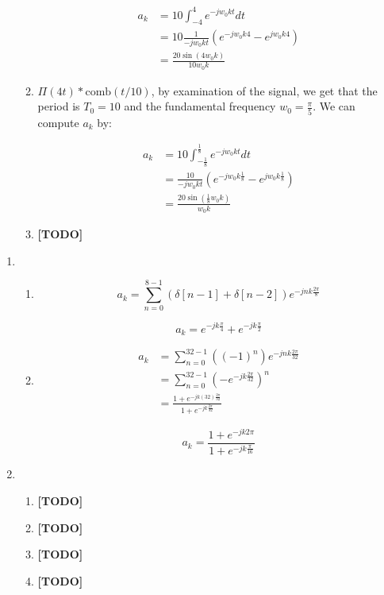 \documentclass[]{article}
\begin{document}
\begin{enumerate}
\begin{enumerate}
    \begin{align*}
        a_k &= 10\int_{-4}^{4} e^{-jw_0 k t} dt \\
            &= 10 \frac{1}{-jw_0kt} \left(  e^{-jw_0k4}- e^{jw_0k4}\right) \\
            &= \boxed{ \frac{20\sin(4w_0 k)}{10 w_0 k} }
    \end{align*}
  \item
    \(\Pi(4t) * \text{comb}(t / 10)\), by examination of the signal, we
    get that the period is \(T_0 = 10\) and the fundamental frequency
    \(\boxed{w_0 = \frac{\pi}{5}}\). We can compute \(a_k\) by:

    \begin{align*}
        a_k &= 10 \int_{-\frac{1}{8}}^{\frac{1}{8}} e^{-jw_0 k t} dt \\
            &= \frac{10}{-jw_0kt } \left(
                e^{-jw_0k\frac{1}{8}}- e^{jw_0k\frac{1}{8}}
            \right) \\
        &= \boxed{ \frac{20\sin(\frac{1}{8}w_0 k)}{w_0 k} }
    \end{align*}
  \item
    \textbf{{[}TODO{]}}
  \end{enumerate}
\end{enumerate}

\begin{enumerate}
\def\labelenumi{\arabic{enumi}.}
\setcounter{enumi}{4}
\item
  \begin{enumerate}
  \def\labelenumii{\alph{enumii}.}
  \item
    \[
        a_k = \sum_{n = 0}^{8 - 1} (\delta[n - 1] + \delta[n - 2]) e^{-j n k \frac{2\pi}{8}}
    \]

    \[
        \boxed{a_k = e^{-jk\frac{\pi}{4}} + e^{-jk\frac{\pi}{2}}}
    \]
  \item
    \begin{align*}
        a_k &= \sum_{n = 0}^{32 - 1} ((-1)^n ) e^{-j n k \frac{2\pi}{32}} \\
            &= \sum_{n = 0}^{32 - 1} (-e^{-j k \frac{2\pi}{32}})^n \\
            &= \frac{1 + e^{-jk(32) \frac{2\pi}{32} }}{1 + e^{-jk\frac{2\pi}{32}}}
    \end{align*}

    \[
        a_k = \boxed{\frac{1 + e^{-jk 2\pi}}{1 + e^{-jk\frac{\pi}{16}}}}
    \]
  \end{enumerate}
\item
  \begin{enumerate}
  \def\labelenumii{\alph{enumii}.}
  \item
    \textbf{{[}TODO{]}}
  \item
    \textbf{{[}TODO{]}}
  \item
    \textbf{{[}TODO{]}}
  \item
    \textbf{{[}TODO{]}}
  \end{enumerate}
\end{enumerate}
\end{document}
